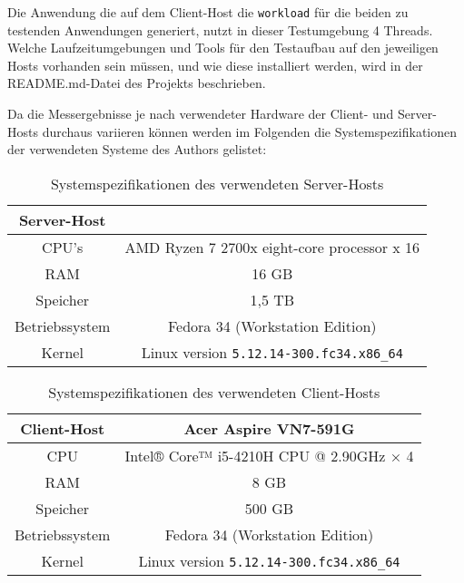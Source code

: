 Die Anwendung die auf dem Client-Host die \verb|workload| für die beiden zu testenden Anwendungen generiert,
nutzt in dieser Testumgebung 4 Threads.
Welche Laufzeitumgebungen und Tools für den Testaufbau auf den jeweiligen Hosts vorhanden sein müssen, und wie diese installiert werden,
wird in der README.md-Datei des Projekts beschrieben.

Da die Messergebnisse je nach verwendeter Hardware der Client- und Server-Hosts durchaus variieren können werden im Folgenden
die Systemspezifikationen der verwendeten Systeme des Authors gelistet:
\begin{table}[ht!]
  \centering
  \begin{tabular}{| c | c |}
    \hline
    Server-Host                                                  \\
    \hline
    CPU's          & AMD Ryzen 7 2700x eight-core processor x 16 \\
    \hline
    RAM            & 16 GB                                       \\
    \hline
    Speicher       & 1,5 TB                                      \\
    \hline
    Betriebssystem & Fedora 34 (Workstation Edition)             \\
    \hline
    Kernel         & Linux version \verb|5.12.14-300.fc34.x86_64|   \\
    \hline
  \end{tabular}
  \caption{Systemspezifikationen des verwendeten Server-Hosts}
  \label{table:system_host}
\end{table}

\begin{table}[ht!]
  \centering
  \begin{tabular}{| c | c |}
    \hline
    Client-Host    & Acer Aspire VN7-591G                      \\
    \hline
    CPU            & Intel® Core™ i5-4210H CPU @ 2.90GHz × 4   \\
    \hline
    RAM            & 8 GB                                      \\
    \hline
    Speicher       & 500 GB                                    \\
    \hline
    Betriebssystem & Fedora 34 (Workstation Edition)           \\
    \hline
    Kernel         & Linux version \verb|5.12.14-300.fc34.x86_64| \\
    \hline
  \end{tabular}
  \caption{Systemspezifikationen des verwendeten Client-Hosts}
  \label{table:system_client}
\end{table}

